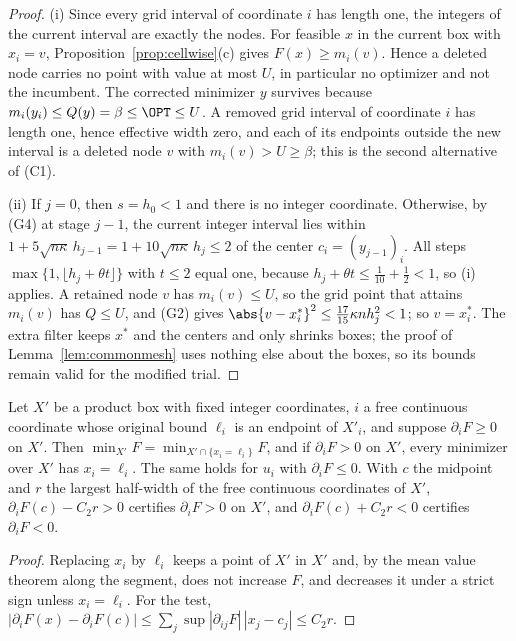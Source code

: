 \begin{proof}
(i) Since every grid interval of coordinate $i$ has length one, the integers
of the current interval are exactly the nodes. For feasible $x$ in the current
box with $x_i=v$, Proposition~\ref{prop:cellwise}(c) gives $F(x)\ge m_i(v)$.
Hence a deleted node
carries no point with value at most $U$, in particular no optimizer and not
the incumbent. The corrected minimizer $y$ survives because
$m_i(y_i)\le Q(y)=\beta\le\OPT\le U$. A removed grid interval of
coordinate $i$ has length one, hence effective width zero, and each of its
endpoints outside the new interval is a deleted node $v$ with
$m_i(v)>U\ge\beta$; this is the second alternative of (C1).

(ii) If $j=0$, then $s=h_0<1$ and there is no integer coordinate. Otherwise,
by (G4) at stage $j-1$, the current integer interval lies within
$1+5\sqrt{n\kappa}\,h_{j-1}=1+10\sqrt{n\kappa}\,h_j\le2$ of the center
$c_i=(y_{j-1})_i$. All steps $\max\{1,\lfloor h_j+\theta t\rfloor\}$ with
$t\le2$ equal one, because $h_j+\theta t\le\frac1{10}+\frac12<1$, so (i)
applies. A retained node $v$ has $m_i(v)\le U$, so the grid point that attains
$m_i(v)$ has $Q\le U$, and (G2) gives
$\abs{v-x^*_i}^2\le\frac{17}{15}\kappa nh_j^2<1$; so $v=x^*_i$. The extra
filter keeps $x^*$ and the centers and only shrinks boxes; the proof of
Lemma~\ref{lem:commonmesh} uses nothing else about the boxes, so its bounds
remain valid for the modified trial.
\end{proof}

\begin{lemma}\label{lem:monotone}
Let $X'$ be a product box with fixed integer coordinates, $i$ a free
continuous coordinate whose original bound $\ell_i$ is an endpoint of $X'_i$,
and suppose $\partial_iF\ge0$ on $X'$. Then
$\min_{X'}F=\min_{X'\cap\{x_i=\ell_i\}}F$, and if $\partial_iF>0$ on $X'$,
every minimizer over $X'$ has $x_i=\ell_i$. The same holds for $u_i$ with
$\partial_iF\le0$. With $c$ the midpoint and $r$ the largest half-width of the
free continuous coordinates of $X'$, $\partial_iF(c)-C_2r>0$ certifies
$\partial_iF>0$ on $X'$, and $\partial_iF(c)+C_2r<0$ certifies
$\partial_iF<0$.
\end{lemma}

\begin{proof}
Replacing $x_i$ by $\ell_i$ keeps a point of $X'$ in $X'$ and, by the mean
value theorem along the segment, does not increase $F$, and decreases it under
a strict sign unless $x_i=\ell_i$. For the test,
$|\partial_iF(x)-\partial_iF(c)|\le\sum_j\sup|\partial_{ij}F|\,|x_j-c_j|\le C_2r$.
\end{proof}

